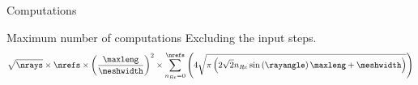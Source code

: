 \documentclass[8pt]{beamer}
\begin{document}
\begin{frame}{Computations}
\begin{block}{Maximum number of computations}
Excluding the input steps.
\begin{equation}
\sqrt{\nrays} \times \nrefs \times \left(\frac{\maxleng}{\meshwidth}\right)^2 \times
\sum_{n_{Re}=0}^{\nrefs}\left(4 \sqrt{\pi \left(2 \sqrt{2}n_{Re}\sin\left(\rayangle\right)\maxleng+\meshwidth \right)} \right)
\end{equation}
\end{block}
\end{frame}
\end{document}
